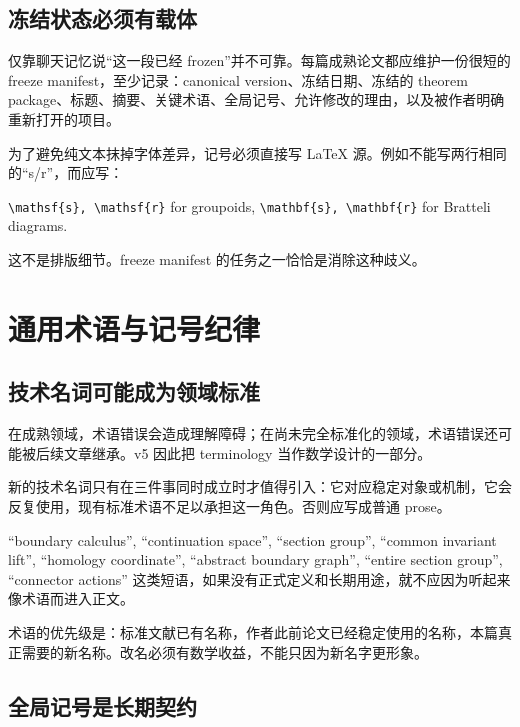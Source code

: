 \documentclass[UTF8,fontset=none,12pt,openany]{ctexbook}
\newcommand{\code}[1]{\texttt{#1}}
\begin{document}
\section{冻结状态必须有载体}

仅靠聊天记忆说“这一段已经 frozen”并不可靠。每篇成熟论文都应维护一份很短的 freeze manifest，至少记录：canonical version、冻结日期、冻结的 theorem package、标题、摘要、关键术语、全局记号、允许修改的理由，以及被作者明确重新打开的项目。

为了避免纯文本抹掉字体差异，记号必须直接写 LaTeX 源。例如不能写两行相同的“s/r”，而应写：

\begin{center}
\code{\textbackslash mathsf\{s\}, \textbackslash mathsf\{r\}} for groupoids,\qquad
\code{\textbackslash mathbf\{s\}, \textbackslash mathbf\{r\}} for Bratteli diagrams.
\end{center}

这不是排版细节。freeze manifest 的任务之一恰恰是消除这种歧义。

\chapter{通用术语与记号纪律}

\section{技术名词可能成为领域标准}

在成熟领域，术语错误会造成理解障碍；在尚未完全标准化的领域，术语错误还可能被后续文章继承。v5 因此把 terminology 当作数学设计的一部分。

新的技术名词只有在三件事同时成立时才值得引入：它对应稳定对象或机制，它会反复使用，现有标准术语不足以承担这一角色。否则应写成普通 prose。

\begin{casebox}
“boundary calculus”, “continuation space”, “section group”, “common invariant lift”, “homology coordinate”, “abstract boundary graph”, “entire section group”, “connector actions” 这类短语，如果没有正式定义和长期用途，就不应因为听起来像术语而进入正文。
\end{casebox}

术语的优先级是：标准文献已有名称，作者此前论文已经稳定使用的名称，本篇真正需要的新名称。改名必须有数学收益，不能只因为新名字更形象。

\section{全局记号是长期契约}
\end{document}
